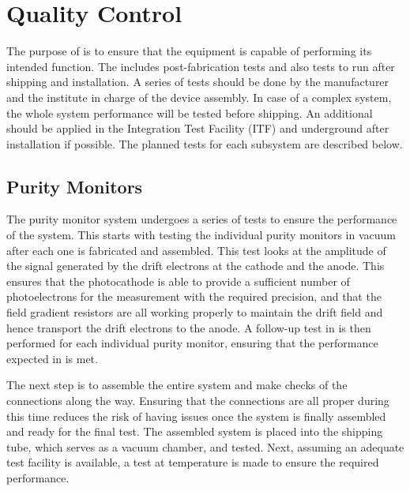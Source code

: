 \section{Quality Control}
\label{sec:fdgen-slow-cryo-qc}
The purpose of   is to ensure that the equipment is capable of performing its intended function. The  includes post-fabrication tests and also tests to run after shipping and installation. A series of tests should be done by the manufacturer and the institute in charge of the device assembly. In case of a complex system, the whole system performance will be tested before shipping. 
An additional  should be applied in the Integration Test Facility (ITF) and underground after installation if possible. The planned tests for each subsystem are described below.  

\subsection{Purity Monitors}
\label{sec:fdgen-slow-cryo-qc-pm}

The purity monitor system undergoes a series of tests to ensure the performance of the system.  This  starts with testing the individual purity monitors in vacuum after each one is fabricated and assembled.  This test looks at the amplitude of the signal generated by the drift electrons at the cathode and the anode.  This ensures that the photocathode is able to provide a sufficient number of photoelectrons for the measurement %
with the required precision, and that the field gradient resistors are all working properly to maintain the drift field and hence transport the drift electrons to the anode.  A follow-up test in \lar is then performed for each individual purity monitor, ensuring that the performance expected in \lar is met.  

The next step %
is to assemble the entire system and make checks of the connections along the way.  Ensuring that the connections are all proper during this time reduces the risk of having issues once the system is finally assembled and ready for the final test.  %
The assembled system is placed into the shipping tube, which serves as a vacuum chamber, and tested. %
Next, assuming an adequate \lar test facility is available, a test at \lar temperature is made to ensure the required performance. 

